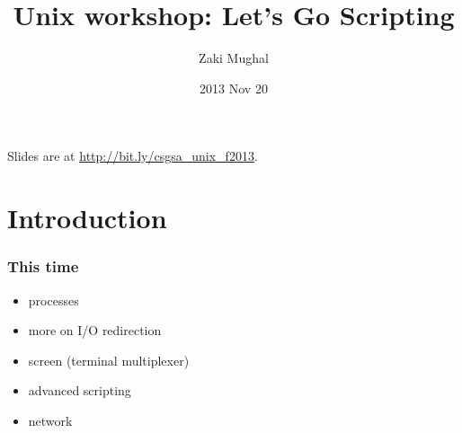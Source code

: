 \documentclass[%
        hyperref={%
                pdfauthor={Zakariyya Mughal},%
                pdfpagemode={None},pdfpagelayout={SinglePage}}%
        xcolor={x11names},%
]{beamer}
\title[Unix Scripting]{Unix workshop: Let's Go Scripting}
\author{Zaki Mughal}
\institute{Computational Biomedicine Lab\\University of Houston}
\date{2013 Nov 20}
\begin{document}
\frame{\titlepage}
\begin{frame}
	Slides are at \url{http://bit.ly/csgsa_unix_f2013}.
\end{frame}
\section{Introduction}\frame{\insertsection}

\begin{frame}
	\frametitle{This time}
	\begin{itemize}
		\item processes
		\item more on I/O redirection
		\item screen (terminal multiplexer)
		\item advanced scripting
		\item network
	\end{itemize}
\end{frame}
\end{document}
